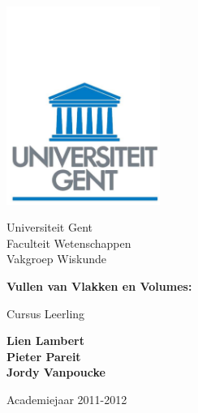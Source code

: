 \documentclass[12pt]{article}
\newif\ifleerkracht
\numberwithin{equation}{section} %
\theoremstyle{plain}  \newtheorem{stel}{Stelling}[section]
\theoremstyle{plain}  \newtheorem{lemma}[stel]{Lemma}
\theoremstyle{plain}  \newtheorem{gevolg}[stel]{Gevolg}
\theoremstyle{definition}  \newtheorem{defi}[stel]{Definitie}
\theoremstyle{definition} \newtheorem{vb}[stel]{Voorbeeld}
\theoremstyle{definition} \newtheorem{vbn}[stel]{Voorbeelden}
\theoremstyle{definition}  \newtheorem{opm}[stel]{Opmerking}
\theoremstyle{plain}  \newtheorem{opdracht}{Opdracht}
\begin{document}
\thispagestyle{empty}

\begin{center}
  \begin{minipage}{7cm}
    \begin{center}

      \includegraphics[width=5cm]{ruglogo.pdf}

      {\large
      Universiteit Gent \\
      Faculteit  Wetenschappen \\
      Vakgroep  Wiskunde
      } 
    \end{center}
  \end{minipage}

  \vspace{3cm}

  {\Huge\bf 
  Vullen van Vlakken en Volumes:\\\vspace*{0.2cm}
  \ifleerkracht
  \Large Cursus Leerkracht
  \else
  \Large Cursus Leerling
  \fi
  }
  
  \baselineskip=12pt
  \vspace{1.5cm}

  {\large\bf  Lien Lambert }\\
  \vspace{0.5cm}
  {\large \bf Pieter Pareit }\\
  \vspace{0.5cm}
  {\large \bf Jordy Vanpoucke}\\

  \baselineskip=12pt

  \vspace{2cm}

  \bigskip

  {\large Academiejaar 2011-2012}

\end{center}

\vfill
\end{document}
